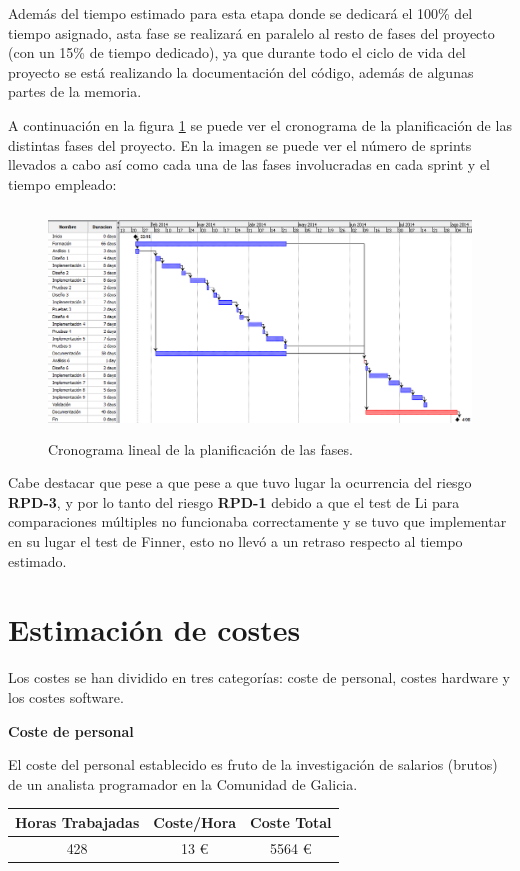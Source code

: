 Además del tiempo estimado para esta etapa donde se dedicará el 100\% del tiempo asignado, asta fase se realizará en paralelo al resto de fases del proyecto (con un 15\% de tiempo dedicado), ya que durante todo el ciclo de vida del proyecto se está realizando la documentación del código, además de algunas partes de la memoria.

A continuación en la figura \ref{fig:gantt} se puede ver el cronograma de la planificación de las distintas fases del proyecto. En la imagen se puede ver el número de sprints llevados a cabo así como cada una de las fases involucradas en cada sprint y el tiempo empleado:

\begin{figure}[H]
\centering
\includegraphics[width=13cm,height=6cm]{figuras/gantt.png}
\caption{Cronograma lineal de la planificación de las fases.}
\label{fig:gantt}
\end{figure}

Cabe destacar que pese a que pese a que tuvo lugar la ocurrencia del riesgo \textbf{RPD-3}, y por lo tanto del riesgo \textbf{RPD-1} debido a que el test de Li para comparaciones múltiples no funcionaba correctamente y se tuvo que implementar en su lugar el test de Finner, esto no llevó a un retraso respecto al tiempo estimado.

\section{Estimación de costes}

Los costes se han dividido en tres categorías: coste de personal, costes hardware y los costes software.

\noindent
\textbf{Coste de personal}

El coste del personal establecido es fruto de la investigación de salarios (brutos) de un analista programador en la Comunidad de Galicia.

\begin{table}[H]
	\centering
	\begin{tabular}{|c|c|c|}
		\hline
		\textbf{Horas Trabajadas} & \textbf{Coste/Hora} & \textbf{Coste Total} \\ \hline
		428 & 13 \euro & 5564 \euro \\ \hline
	\end{tabular}
\end{table}

